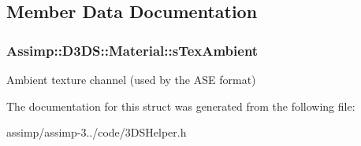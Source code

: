 \subsection{Member Data Documentation}
\hypertarget{struct_assimp_1_1_d3_d_s_1_1_material_a429d8524c3df5f0c16bda979cb0640ce}{
\subsubsection[{s\+Tex\+Ambient}]{ Assimp\+::\+D3\+D\+S\+::\+Material\+::s\+Tex\+Ambient}}\label{struct_assimp_1_1_d3_d_s_1_1_material_a429d8524c3df5f0c16bda979cb0640ce}
Ambient texture channel (used by the A\+S\+E format) 

The documentation for this struct was generated from the following file\+:\begin{DoxyCompactItemize}
\item 
assimp/assimp-\/3../code/3\+D\+S\+Helper.\+h\end{DoxyCompactItemize}

